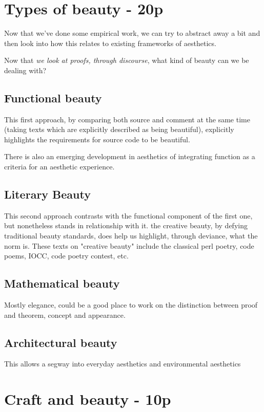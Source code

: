\section{Types of beauty  - 20p}

Now that we've done some empirical work, we can try to abstract away a bit and then look into how this relates to existing frameworks of aesthetics. 

Now that \emph{we look at proofs, through discourse}, what kind of beauty can we be dealing with?

\subsection{Functional beauty}

This first approach, by comparing both source and comment at the same time (taking texts which are explicitly described as being beautiful), explicitly highlights the requirements for source code to be beautiful. 

There is also an emerging development in aesthetics of integrating function as a criteria for an aesthetic experience.

\subsection{Literary Beauty}

This second approach contrasts with the functional component of the first one, but nonetheless stands in relationship with it. the creative beauty, by defying traditional beauty standards, does help us highlight, through deviance, what the norm is. These texts on "creative beauty" include the classical perl poetry, code poems, IOCC, code poetry contest, etc.

\subsection{Mathematical beauty}

Mostly elegance, could be a good place to work on the distinction between proof and theorem, concept and appearance.

\subsection{Architectural beauty}

This allows a segway into everyday aesthetics and environmental aesthetics

\section{Craft and beauty - 10p}

